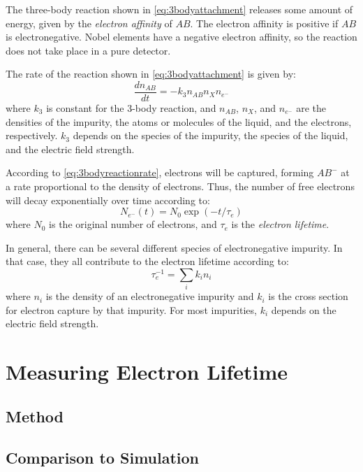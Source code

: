 \documentclass[herrin-thesis.tex]{subfiles}
\begin{document}
The three-body reaction shown in \cref{eq:3bodyattachment} releases some amount of energy, given by the \emph{electron affinity} of \(AB\). The electron affinity is positive if \(AB\) is electronegative. Nobel elements have a negative electron affinity, so the reaction does not take place in a pure detector.

The rate of the reaction shown in \cref{eq:3bodyattachment} is given by:
\begin{equation}
\frac{dn_{AB}}{dt} = -k_{3} n_{AB} n_{X} n_{e^{-}}
\label{eq:3bodyreactionrate}
\end{equation}
where \(k_3\) is constant for the 3-body reaction, and \(n_{AB}\), \(n_{X}\), and \(n_{e^{-}}\) are the densities of the impurity, the atoms or molecules of the liquid, and the electrons, respectively. \(k_3\) depends on the species of the impurity, the species of the liquid, and the electric field strength.

According to \cref{eq:3bodyreactionrate}, electrons will be captured, forming \(AB^{-}\) at a rate proportional to the density of electrons. Thus, the number of free electrons will decay exponentially over time according to:
\begin{equation}
N_{e^{-}}(t) = N_0 \exp (-t/\tau_e)
\label{eq:exponentialtaue}
\end{equation}
where \(N_0\) is the original number of electrons, and \(\tau_e\) is the \emph{electron lifetime}.

In general, there can be several different species of electronegative impurity. In that case, they all contribute to the electron lifetime according to:
\begin{equation}
\tau_e^{-1} = \sum_i k_i n_i
\label{eq:tauedefinition}
\end{equation}
where \(n_i\) is the density of an electronegative impurity and \(k_i\) is the cross section for electron capture by that impurity. For most impurities, \(k_i\) depends on the electric field strength.

\section{Measuring Electron Lifetime}


\subsection{Method}

\subsection{Comparison to Simulation}
\end{document}

